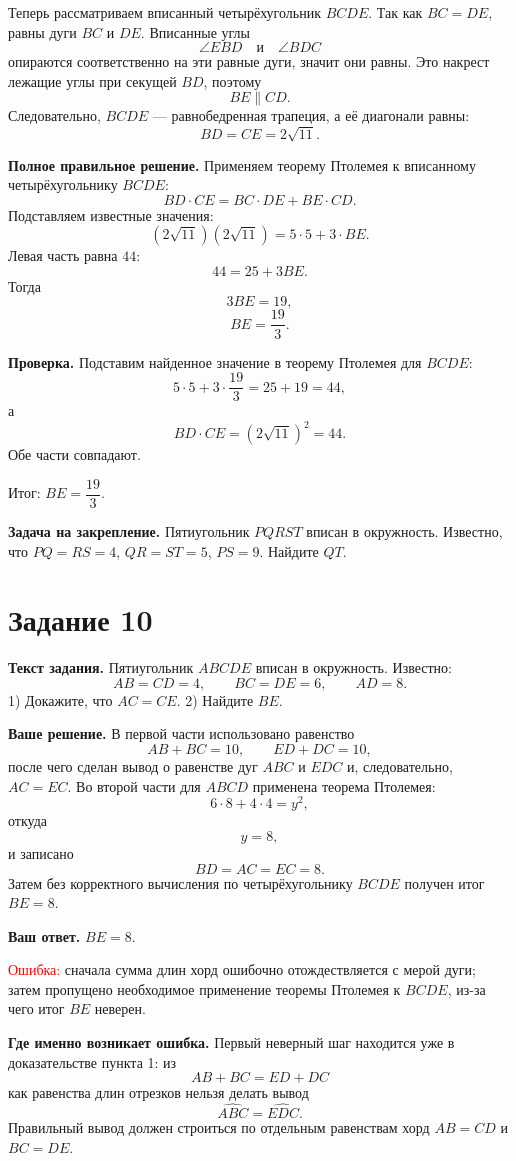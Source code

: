 \documentclass[12pt,a4paper]{article}
\newcommand{\errlabel}[1]{\textcolor{red}{Ошибка:} #1}
\newcommand{\resultlabel}[1]{\textcolor{teal!60!black}{Итог:} #1}
\begin{document}
Теперь рассматриваем вписанный четырёхугольник $BCDE$. Так как $BC=DE$, равны дуги $BC$ и $DE$. Вписанные углы
\[
\angle EBD \quad\text{и}\quad \angle BDC
\]
опираются соответственно на эти равные дуги, значит они равны. Это накрест лежащие углы при секущей $BD$, поэтому
\[
BE\parallel CD.
\]
Следовательно, $BCDE$ --- равнобедренная трапеция, а её диагонали равны:
\[
BD=CE=2\sqrt{11}.
\]

\textbf{Полное правильное решение.} Применяем теорему Птолемея к вписанному четырёхугольнику $BCDE$:
\[
BD\cdot CE=BC\cdot DE+BE\cdot CD.
\]
Подставляем известные значения:
\[
(2\sqrt{11})(2\sqrt{11})=5\cdot5+3\cdot BE.
\]
Левая часть равна $44$:
\[
44=25+3BE.
\]
Тогда
\[
3BE=19,
\]
\[
BE=\frac{19}{3}.
\]

\textbf{Проверка.} Подставим найденное значение в теорему Птолемея для $BCDE$:
\[
5\cdot5+3\cdot\frac{19}{3}=25+19=44,
\]
а
\[
BD\cdot CE=(2\sqrt{11})^2=44.
\]
Обе части совпадают.

\resultlabel{$BE=\dfrac{19}{3}$.}

\textbf{Задача на закрепление.} Пятиугольник $PQRST$ вписан в окружность. Известно, что $PQ=RS=4$, $QR=ST=5$, $PS=9$. Найдите $QT$.

\newpage
{}\label{task:10}
\section*{Задание 10}

\textbf{Текст задания.} Пятиугольник $ABCDE$ вписан в окружность. Известно:
\[
AB=CD=4,\qquad BC=DE=6,\qquad AD=8.
\]
1) Докажите, что $AC=CE$. 2) Найдите $BE$.

\textbf{Ваше решение.} В первой части использовано равенство
\[
AB+BC=10,\qquad ED+DC=10,
\]
после чего сделан вывод о равенстве дуг $ABC$ и $EDC$ и, следовательно, $AC=EC$. Во второй части для $ABCD$ применена теорема Птолемея:
\[
6\cdot8+4\cdot4=y^2,
\]
откуда
\[
y=8,
\]
и записано
\[
BD=AC=EC=8.
\]
Затем без корректного вычисления по четырёхугольнику $BCDE$ получен итог $BE=8$.

\textbf{Ваш ответ.} $BE=8$.

\errlabel{сначала сумма длин хорд ошибочно отождествляется с мерой дуги; затем пропущено необходимое применение теоремы Птолемея к $BCDE$, из-за чего итог $BE$ неверен.}

\textbf{Где именно возникает ошибка.} Первый неверный шаг находится уже в доказательстве пункта 1: из
\[
AB+BC=ED+DC
\]
как равенства длин отрезков нельзя делать вывод
\[
\widehat{ABC}=\widehat{EDC}.
\]
Правильный вывод должен строиться по отдельным равенствам хорд $AB=CD$ и $BC=DE$.
\end{document}
